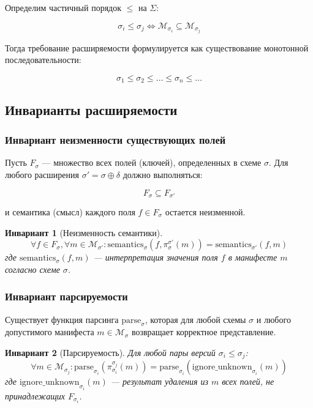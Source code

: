 \documentclass{article}
\newtheorem{invariant}{Инвариант}
\begin{document}
Определим частичный порядок $\leq$ на $\Sigma$:

\[
\sigma_i \leq \sigma_j \iff \mathcal{M}_{\sigma_i} \subseteq \mathcal{M}_{\sigma_j}
\]

Тогда требование расширяемости формулируется как существование монотонной последовательности:

\[
\sigma_1 \leq \sigma_2 \leq \ldots \leq \sigma_n \leq \ldots
\]

\subsection{Инварианты расширяемости}

\subsubsection{Инвариант неизменности существующих полей}

Пусть $F_{\sigma}$ — множество всех полей (ключей), определенных в схеме $\sigma$. Для любого расширения $\sigma' = \sigma \oplus \delta$ должно выполняться:

\[
F_{\sigma} \subseteq F_{\sigma'}
\]

и семантика (смысл) каждого поля $f \in F_{\sigma}$ остается неизменной.

\begin{invariant}[Неизменность семантики]
\[
\forall f \in F_{\sigma}, \forall m \in \mathcal{M}_{\sigma'}: \text{semantics}_{\sigma}(f, \pi_{\sigma}^{\sigma'}(m)) = \text{semantics}_{\sigma'}(f, m)
\]
где $\text{semantics}_{\sigma}(f, m)$ — интерпретация значения поля $f$ в манифесте $m$ согласно схеме $\sigma$.
\end{invariant}

\subsubsection{Инвариант парсируемости}

Существует функция парсинга $\text{parse}_{\sigma}$, которая для любой схемы $\sigma$ и любого допустимого манифеста $m \in \mathcal{M}_{\sigma}$ возвращает корректное представление.

\begin{invariant}[Парсируемость]
Для любой пары версий $\sigma_i \leq \sigma_j$:
\[
\forall m \in \mathcal{M}_{\sigma_j}: \text{parse}_{\sigma_i}(\pi_{\sigma_i}^{\sigma_j}(m)) = \text{parse}_{\sigma_i}(\text{ignore\_unknown}_{\sigma_i}(m))
\]
где $\text{ignore\_unknown}_{\sigma_i}(m)$ — результат удаления из $m$ всех полей, не принадлежащих $F_{\sigma_i}$.
\end{invariant}
\end{document}
